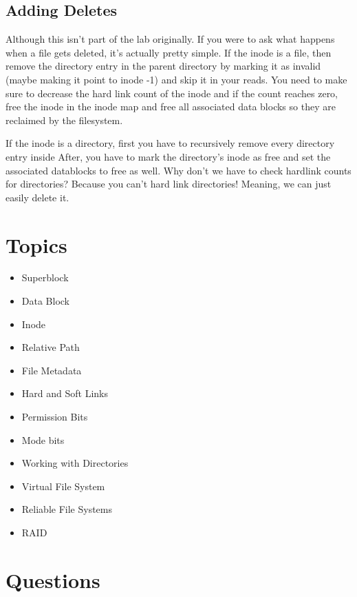 \subsection{Adding Deletes}

Although this isn't part of the lab originally.
If you were to ask what happens when a file gets deleted, it's actually pretty simple.
If the inode is a file, then remove the directory entry in the parent directory by marking it as invalid (maybe making it point to inode -1) and skip it in your reads.
You need to make sure to decrease the hard link count of the inode and if the count reaches zero, free the inode in the inode map and free all associated data blocks so they are reclaimed by the filesystem.

If the inode is a directory, first you have to recursively remove every directory entry inside
After, you have to mark the directory's inode as free and set the associated datablocks to free as well.
Why don't we have to check hardlink counts for directories?
Because you can't hard link directories! Meaning, we can just easily delete it.

\section{Topics}

\begin{itemize}
\tightlist
\item
  Superblock
\item
  Data Block
\item
  Inode
\item
  Relative Path
\item
  File Metadata
\item
  Hard and Soft Links
\item
  Permission Bits
\item
  Mode bits
\item
  Working with Directories
\item
  Virtual File System
\item
  Reliable File Systems
\item
  RAID
\end{itemize}

\section{Questions}

